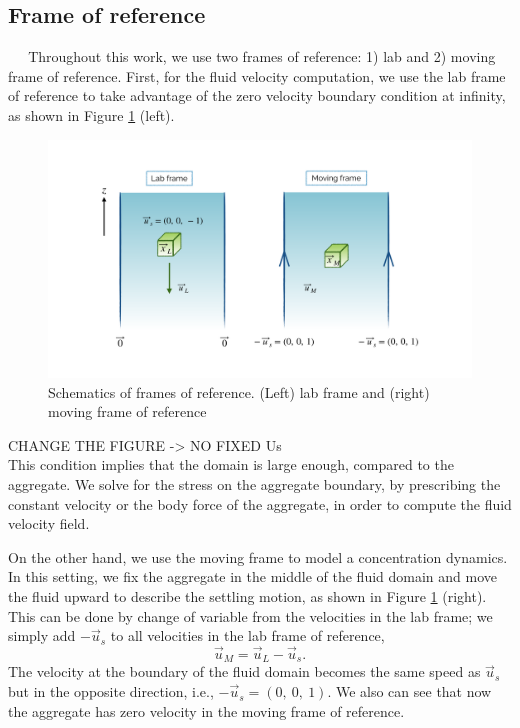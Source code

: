 \subsection{Frame of reference}
$\ \ \ \ \ $ 
Throughout this work, we use two frames of reference: 1) lab and 2) moving frame of reference. First, for the fluid velocity computation, we use the lab frame of reference to take advantage of the zero velocity boundary condition at infinity, as shown in Figure \ref{fig_frame_ref} (left). 
\begin{figure}[h]
	\begin{center}
		\includegraphics[scale=0.25]{figures/fig_frame_ref}
	\end{center}
	\caption{Schematics of frames of reference. (Left) lab frame and (right) moving frame of reference }
	\label{fig_frame_ref}
\end{figure}
{\color{blue} CHANGE THE FIGURE -> NO FIXED Us}
\\
This condition implies that the domain is large enough, compared to the aggregate.
We solve for the stress on the aggregate boundary, by prescribing the constant velocity or the body force of the aggregate, in order to compute the fluid velocity field. 
\par
On the other hand, we use the moving frame to model a concentration dynamics.
In this setting, we fix the aggregate in the middle of the fluid domain and move the fluid upward to describe the settling motion, as shown in Figure \ref{fig_frame_ref} (right).
This can be done by change of variable from the velocities in the lab frame; we simply add $-\vec{u}_s$ to all velocities in the lab frame of reference,
\[
\vec{u}_M = \vec{u}_L - \vec{u}_s.
\]
 The velocity at the boundary of the fluid domain becomes the same speed as $\vec{u}_s$ but in the opposite direction, i.e., $-\vec{u}_s = (0, \ 0, \ 1)$. We also can see that now the aggregate has zero velocity in the moving frame of reference.


